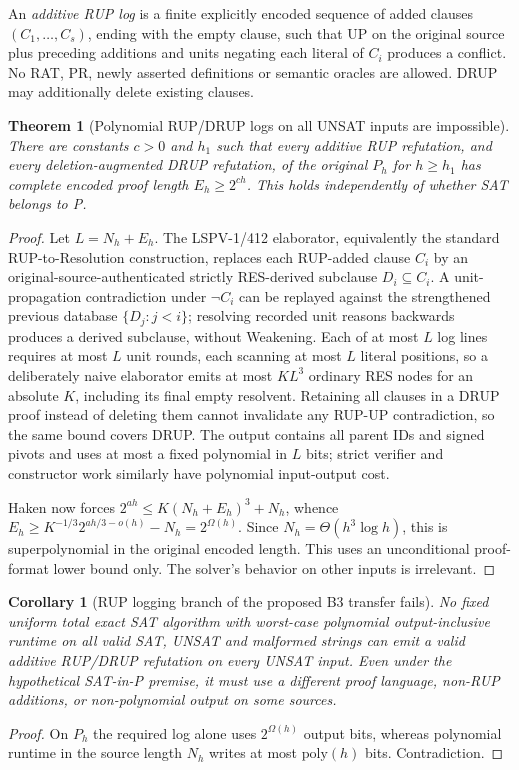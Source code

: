 \documentclass[11pt]{article}
\newtheorem{theorem}{Theorem}
\newtheorem{corollary}{Corollary}
\begin{document}
An \emph{additive RUP log} is a finite explicitly encoded sequence of added clauses $(C_1,\ldots,C_s)$, ending with the empty clause, such that UP on the original source plus preceding additions and units negating each literal of $C_i$ produces a conflict. No RAT, PR, newly asserted definitions or semantic oracles are allowed. DRUP may additionally delete existing clauses.

\begin{theorem}[Polynomial RUP/DRUP logs on all UNSAT inputs are impossible]
There are constants $c>0$ and $h_1$ such that every additive RUP refutation, and every deletion-augmented DRUP refutation, of the original $P_h$ for $h\ge h_1$ has complete encoded proof length $E_h\ge 2^{ch}$. This holds independently of whether SAT belongs to P.
\end{theorem}
\begin{proof}
Let $L=N_h+E_h$. The LSPV-1/412 elaborator, equivalently the standard RUP-to-Resolution construction, replaces each RUP-added clause $C_i$ by an original-source-authenticated strictly RES-derived subclause $D_i\subseteq C_i$. A unit-propagation contradiction under $\neg C_i$ can be replayed against the strengthened previous database $\{D_j:j<i\}$; resolving recorded unit reasons backwards produces a derived subclause, without Weakening. Each of at most $L$ log lines requires at most $L$ unit rounds, each scanning at most $L$ literal positions, so a deliberately naive elaborator emits at most $K L^3$ ordinary RES nodes for an absolute $K$, including its final empty resolvent. Retaining all clauses in a DRUP proof instead of deleting them cannot invalidate any RUP-UP contradiction, so the same bound covers DRUP. The output contains all parent IDs and signed pivots and uses at most a fixed polynomial in $L$ bits; strict verifier and constructor work similarly have polynomial input-output cost.

Haken now forces $2^{ah}\le K(N_h+E_h)^3+N_h$, whence
$E_h\ge K^{-1/3}2^{a h/3-o(h)}-N_h=2^{\Omega(h)}$.
Since $N_h=\Theta(h^3\log h)$, this is superpolynomial in the original encoded length. This uses an unconditional proof-format lower bound only. The solver's behavior on other inputs is irrelevant.
\end{proof}

\begin{corollary}[RUP logging branch of the proposed B3 transfer fails]
No fixed uniform total exact SAT algorithm with worst-case polynomial output-inclusive runtime on all valid SAT, UNSAT and malformed strings can emit a valid additive RUP/DRUP refutation on \emph{every} UNSAT input. Even under the hypothetical SAT-in-P premise, it must use a different proof language, non-RUP additions, or non-polynomial output on some sources.
\end{corollary}
\begin{proof}
On $P_h$ the required log alone uses $2^{\Omega(h)}$ output bits, whereas polynomial runtime in the source length $N_h$ writes at most $\mathrm{poly}(h)$ bits. Contradiction.
\end{proof}
\end{document}
